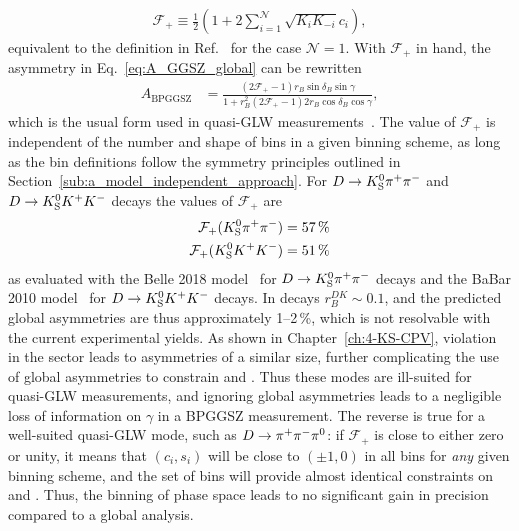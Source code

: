 \begin{align}\label{eq:Fplus_global}
    \mathcal F_+ \equiv \frac{1}{2}\left(1 + 2\sum_{i=1}^{\mathcal N} \sqrt{K_i K_{-i}}c_i\right),
\end{align}
equivalent to the definition in Ref.~\cite{nayakFirstDeterminationCP2015} for the case $\mathcal N=1$.  With $\mathcal F_+$ in hand, the asymmetry in Eq.~\eqref{eq:A_GGSZ_global} can be rewritten
\begin{align}
    A_\mathrm{BPGGSZ} &= \frac{(2\mathcal F_+-1) r_B \sin \delta_B \sin \gamma}{1 + r_B^2 (2\mathcal F_+-1) 2 r_B \cos \delta_B \cos \gamma},
\end{align}
which is the usual form used in quasi-GLW measurements~\cite{nayakFirstDeterminationCP2015,maldeFirstDeterminationCP2015}. The value of $\mathcal F_+$ is independent of the number and shape of bins in a given binning scheme, as long as the bin definitions follow the symmetry principles outlined in Section~\ref{sub:a_model_independent_approach}. 
For ${{D}\rightarrow{\ensuremath{{K}^0_{\mathrm{S}}}}{\ensuremath{{\pi}^+}}{\ensuremath{{\pi}^-}}}$ and ${D}\rightarrow{\ensuremath{{K}^0_{\mathrm{S}}}}{\ensuremath{{K}^+}}{\ensuremath{{K}^-}}$ decays the values of $\mathcal F_+$ are
\begin{align}
\begin{split}
    \mathcal F_+({{K}^0_{\mathrm{S}}}{{\pi}^+}{{\pi}^-}) = 57\,\% \\
    \mathcal F_+({{K}^0_{\mathrm{S}}}{{K}^+}{{K}^-}) = 51\,\%
\end{split}
\end{align}
as evaluated with the Belle 2018 model~\cite{Belle2018} for ${{D}\rightarrow{\ensuremath{{K}^0_{\mathrm{S}}}}{\ensuremath{{\pi}^+}}{\ensuremath{{\pi}^-}}}$ decays and the BaBar 2010 model~\cite{BABAR2010} for ${D}\rightarrow{\ensuremath{{K}^0_{\mathrm{S}}}}{\ensuremath{{K}^+}}{\ensuremath{{K}^-}}$ decays. In \BtoDK decays $r_B^{DK}\sim 0.1$, and the predicted global asymmetries are thus approximately 1--2\,\%, which is not resolvable with the current experimental yields. As shown in Chapter~\ref{ch:4-KS-CPV}, \CP violation in the \KS sector leads to asymmetries of a similar size, further complicating the use of global asymmetries to constrain \xpm and \ypm. Thus these modes are ill-suited for quasi-GLW measurements, and ignoring global asymmetries leads to a negligible loss of information on $\gamma$ in a BPGGSZ measurement. The reverse is true for a well-suited quasi-GLW mode, such as ${D}\rightarrow{\ensuremath{{\pi}^+}}{\ensuremath{{\pi}^-}}{\ensuremath{{\pi}^0}}$: if $\mathcal F_+$ is close to either zero or unity, it means that $(c_i, s_i)$ will be close to $(\pm1, 0)$ in all bins for \emph{any} given binning scheme, and the set of bins will provide almost identical constraints on \xpm and \ypm. Thus, the binning of phase space leads to no significant gain in precision compared to a global analysis.


